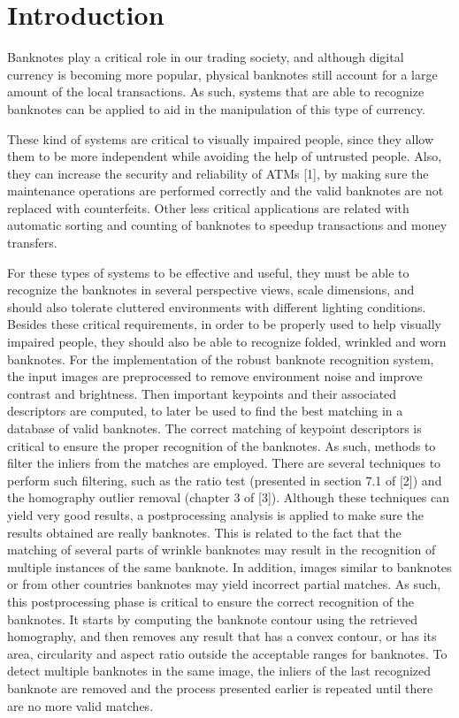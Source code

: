 \section{Introduction}\label{sec:introduction}

Banknotes play a critical role in our trading society, and although digital currency is becoming more popular, physical banknotes still account for a large amount of the local transactions. As such, systems that are able to recognize banknotes can be applied to aid in the manipulation of this type of currency.

These kind of systems are critical to visually impaired people, since they allow them to be more independent while avoiding the help of untrusted people. Also, they can increase the security and reliability of ATMs [1], by making sure the maintenance operations are performed correctly and the valid banknotes are not replaced with counterfeits. Other less critical applications are related with automatic sorting and counting of banknotes to speedup transactions and money transfers.

For these types of systems to be effective and useful, they must be able to recognize the banknotes in several perspective views, scale dimensions, and should also tolerate cluttered environments with different lighting conditions. Besides these critical requirements, in order to be properly used to help visually impaired people, they should also be able to recognize folded, wrinkled and worn banknotes.
For the implementation of the robust banknote recognition system, the input images are preprocessed to remove environment noise and improve contrast and brightness. Then important keypoints and their associated descriptors are computed, to later be used to find the best matching in a database of valid banknotes. The correct matching of keypoint descriptors is critical to ensure the proper recognition of the banknotes. As such, methods to filter the inliers from the matches are employed. There are several techniques to perform such filtering, such as the ratio test (presented in section 7.1 of [2]) and the homography outlier removal (chapter 3 of [3]). Although these techniques can yield very good results, a postprocessing analysis is applied to make sure the results obtained are really banknotes. This is related to the fact that the matching of several parts of wrinkle banknotes may result in the recognition of multiple instances of the same banknote. In addition, images similar to banknotes or from other countries banknotes may yield incorrect partial matches. As such, this postprocessing phase is critical to ensure the correct recognition of the banknotes. It starts by computing the banknote contour using the retrieved homography, and then removes any result that has a convex contour, or has its area, circularity and aspect ratio outside the acceptable ranges for banknotes. To detect multiple banknotes in the same image, the inliers of the last recognized banknote are removed and the process presented earlier is repeated until there are no more valid matches.

